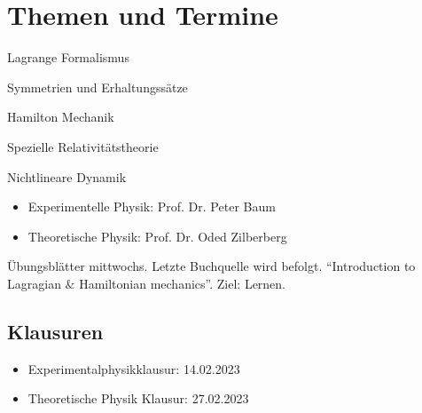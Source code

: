 \documentclass[../main.tex]{subfiles}
\begin{document}
	\tableofcontents
	\newpage

	
	\section*{Themen und Termine}
		\begin{clist}
			\item Lagrange Formalismus
			\item Symmetrien und Erhaltungssätze
			\item Hamilton Mechanik
			\item Spezielle Relativitätstheorie
			\item Nichtlineare Dynamik
		\end{clist}
		\begin{itemize}
			\item Experimentelle Physik: Prof. Dr. Peter Baum
			\item Theoretische Physik: Prof. Dr. Oded Zilberberg
		\end{itemize}
		Übungsblätter mittwochs. Letzte Buchquelle wird befolgt. \enquote{Introduction to Lagragian $\&$ Hamiltonian mechanics}. Ziel: Lernen. 
		
		\subsection*{Klausuren}
			\begin{itemize}
				\item Experimentalphysikklausur: 14.02.2023
				\item Theoretische Physik Klausur: 27.02.2023
			\end{itemize}
		
\end{document}
